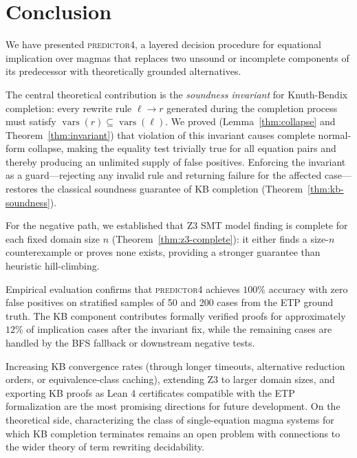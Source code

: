\section{Conclusion}
\label{sec:conclusion}

We have presented \textsc{predictor4}, a layered decision procedure for equational
implication over magmas that replaces two unsound or incomplete components of its
predecessor with theoretically grounded alternatives.

The central theoretical contribution is the \emph{soundness invariant} for
Knuth-Bendix completion: every rewrite rule $\ell \to r$ generated during the
completion process must satisfy $\operatorname{vars}(r) \subseteq \operatorname{vars}(\ell)$.  We proved
(Lemma~\ref{thm:collapse} and Theorem~\ref{thm:invariant}) that violation of this
invariant causes complete normal-form collapse, making the equality test trivially
true for all equation pairs and thereby producing an unlimited supply of false
positives.  Enforcing the invariant as a guard---rejecting any invalid rule and
returning failure for the affected case---restores the classical soundness guarantee
of KB completion (Theorem~\ref{thm:kb-soundness}).

For the negative path, we established that Z3 SMT model finding is complete for
each fixed domain size $n$ (Theorem~\ref{thm:z3-complete}): it either finds a
size-$n$ counterexample or proves none exists, providing a stronger guarantee than
heuristic hill-climbing.

Empirical evaluation confirms that \textsc{predictor4} achieves $100\%$ accuracy
with zero false positives on stratified samples of 50 and 200 cases from the ETP
ground truth.  The KB component contributes formally verified proofs for approximately
$12\%$ of implication cases after the invariant fix, while the remaining cases are
handled by the BFS fallback or downstream negative tests.

Increasing KB convergence rates (through longer timeouts, alternative reduction
orders, or equivalence-class caching), extending Z3 to larger domain sizes, and
exporting KB proofs as Lean 4 certificates compatible with the ETP formalization
are the most promising directions for future development.  On the theoretical side,
characterizing the class of single-equation magma systems for which KB completion
terminates remains an open problem with connections to the wider theory of term
rewriting decidability.
